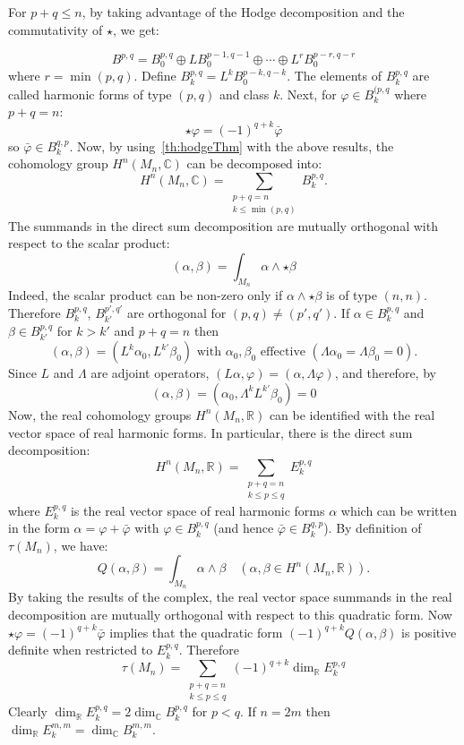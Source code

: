 \documentclass{ut-thesis}
\newenvironment{Proof}[1][]
  {\begin{ProofTcb}[#1]}
  {\end{ProofTcb}}
\renewcommand{\phi}{\varphi}
\begin{document}
\begin{Proof}
  For $p+q \leq n$, by taking advantage of the Hodge decomposition and the commutativity of $\star$, we get:

  \[
    B^{p,q} = B_0^{p,q} \oplus LB_0^{p-1,q-1} \oplus \cdots \oplus L^r B_0^{p-r,q-r}
  \]
  where $r = \min(p,q)$. Define $B_k^{p,q} = L^k B_0^{p-k,q-k}$. The elements of $B_k^{p,q}$ are called
  harmonic forms of type $(p,q)$ and class $k$. Next, for $\phi \in B_k^{(p,q}$ where $p+q=n$:
  \[
    \star\phi = (-1)^{q+k}\bar{\phi}
  \]
  so $\bar{\phi}\in B_k^{q,p}$. Now,
  by using~\cref{th:hodgeThm} with the above results, the cohomology group $H^n(M_n,\mathbb{C})$ can be decomposed into:
  \[
    H^n(M_n,\mathbb{C}) = \sum_{\substack{p+q=n \\k \leq \min(p,q)}} B_k^{p,q}.
  \]
 The summands in the direct sum decomposition are mutually orthogonal with respect to the scalar product:
  \[
      (\alpha,\beta) = \int_{M_n} \alpha \wedge \star\beta
  \]
  Indeed, the scalar product can be non-zero only if $\alpha \wedge \star\beta$ is of type $(n,n)$. Therefore
  $B_k^{p,q}$, $B_{k'}^{p',q'}$ are orthogonal for $(p,q) \neq (p',q')$. If $\alpha \in B_k^{p,q}$ and $\beta
  \in B_{k'}^{p,q}$ for $k > k'$ and $p+q=n$ then
  \[
      (\alpha,\beta) = (L^k \alpha_0, L^{k'} \beta_0) \text{ with } \alpha_0, \beta_0 \text{ effective } (\Lambda \alpha_0 = \Lambda \beta_0 = 0).
  \]
  Since $L$ and $\Lambda$ are adjoint operators, $(L\alpha,\phi) = (\alpha,\Lambda\phi)$, and therefore, by
  \[
    (\alpha,\beta) = (\alpha_0,\Lambda^k L^{k'} \beta_0) = 0
  \]
  Now, the real cohomology groups $H^n(M_n,\mathbb{R})$ can be identified with the real vector space of real harmonic
  forms. In particular, there is the direct sum decomposition:
  \[
    H^n(M_n,\mathbb{R}) = \sum_{\substack{p+q=n \\ k \leq p \leq q}} E_k^{p,q}
  \]
  where $E_k^{p,q}$ is the real vector space of real harmonic forms $\alpha$ which can be written in the form
  $\alpha = \phi + \bar{\phi}$ with $\phi \in B_k^{p,q}$ (and hence $\bar{\phi} \in B_k^{q,p}$). By definition
  of
  $\tau(M_n)$, we have:
  \[
      Q(\alpha,\beta) = \int_{M_n} \alpha \wedge \beta \quad (\alpha,\beta \in H^n(M_n,\mathbb{R})).
  \]
  By taking the results of the complex, the real vector space summands in the real decomposition are mutually
  orthogonal with respect to this quadratic form. Now $\star\phi = (-1)^{q+k}\bar{\phi}$ implies that the
  quadratic form $(-1)^{q+k}Q(\alpha,\beta)$ is positive definite when restricted to $E_k^{p,q}$. Therefore
  \[
    \tau(M_n) = \sum_{\substack{p+q=n\\k\le p\le q}} (-1)^{q+k} \dim_{\mathbb{R}} E_k^{p,q}
  \]
  Clearly $\dim_{\mathbb{R}} E_k^{p,q} = 2\dim_{\mathbb{C}} B_k^{p,q}$ for $p < q$. If $n=2m$ then $\dim_{\mathbb{R}} E_k^{m,m} = \dim_{\mathbb{C}} B_k^{m,m}$.


\end{Proof}
\end{document}

